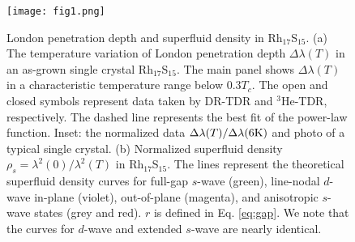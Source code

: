 \documentclass[aps,pra,reprint,superscriptaddress,floatfix]{revtex4-2}
\newcommand{\rhs}{Rh$_{17}$S$_{15}$}
\begin{document}
\begin{figure}
\texttt{[image: fig1.png]}%
\caption{\label{fig1} London penetration depth and superfluid density in \rhs. (a) The temperature variation of London penetration depth $\Delta\lambda(T)$ in an as-grown single crystal \rhs. The main panel shows $\Delta\lambda(T)$ in a characteristic temperature range below $0.3T_c$. The open and closed symbols represent data taken by DR-TDR and $^3$He-TDR, respectively. The dashed line represents the best fit of the power-law function. Inset: the normalized data $\Delta\lambda(T)/\Delta\lambda(6\textmd{K})$ and photo of a typical single crystal.
(b) Normalized superfluid density $\rho_s=\lambda^2(0)/\lambda^2(T)$ in \rhs. The lines represent the theoretical superfluid density curves for full-gap $s$-wave (green), line-nodal $d$-wave in-plane (violet), out-of-plane (magenta), and anisotropic $s$-wave states (grey and red). $r$ is defined in Eq. \ref{eq:gap}. We note that the curves for $d$-wave and extended $s$-wave are nearly identical.
}
\end{figure}
\end{document}
